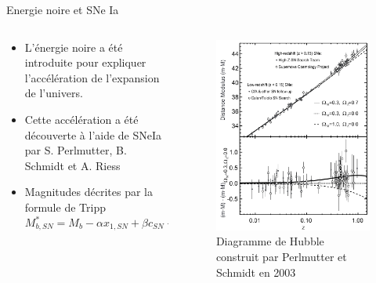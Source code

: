 \documentclass{beamer}
\begin{document}
\begin{frame}{Energie noire et SNe Ia}
\begin{columns}
\begin{column}{0.6\textwidth}
	\begin{itemize}
\item L'énergie noire a été introduite pour expliquer l'accélération de l'expansion de l'univers.
\item	Cette accélération a été découverte à l'aide de SNeIa par S. Perlmutter, B. Schmidt et A. Riess
\item Magnitudes décrites par la formule de Tripp
\begin{equation}
	M^*_{b,SN} = M_b - \alpha x_{1,SN} + \beta c_{SN} + n(\sigma_{int})
\end{equation}
\end{itemize}
\end{column}
\begin{column}{0.4\textwidth}
	\begin{figure}
		\centering
		\includegraphics[height=0.6\textheight]{figures/Perlmutter_Schmidt.png}
		\caption{Diagramme de Hubble construit par Perlmutter et Schmidt en 2003}
	\end{figure}
\end{column}
\end{columns}
\end{frame}
\end{document}
